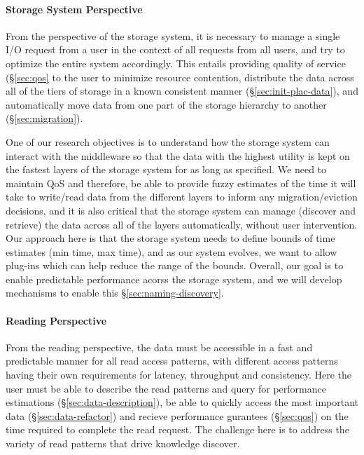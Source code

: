 \paragraph{Storage System Perspective}
\label{subsec:storage-perspective}
From the perspective of the storage system, it is necessary to manage a
single I/O request from a user in the context of all requests from all
users, and try to optimize the entire system accordingly. This entails
providing quality of service (\S\ref{sec:qos} to the user to minimize
resource contention, distribute the data across all of the tiers of storage
in a known consistent manner (\S\ref{sec:init-plac-data}), and automatically move data from one part of
the storage hierarchy to another (\S\ref{sec:migration}). 

One of our research objectives is to understand how the
storage system can interact with the middleware   so
that the data with the highest utility is kept on the fastest layers of the
storage system for as long as specified. We need to maintain 
QoS and therefore, be able to provide fuzzy estimates of the time it will take to write/read data from
the different layers to inform any migration/eviction decisions, and it
is also critical that the storage system can manage (discover and retrieve) the data across all of the
layers automatically, without user intervention. 
Our approach here is that the storage system needs to define bounds of time estimates
(min time, max time), and as our system evolves, we want to allow plug-ins which can help
reduce the range of the bounds.
Overall, our goal is to enable predictable performance acorss the storage system, and we will develop mechanisms to enable this
\S\ref{sec:naming-discovery}.



\paragraph{Reading  Perspective}
\label{subsec:reading-perspective}

From the reading perspective, the data must be accessible in a fast and
predictable manner for all read access patterns, with different access
patterns having their own requirements for latency, throughput and
consistency. Here the user must be able to describe the read patterns and
query for performance estimations (\S\ref{sec:data-description}), be able
to quickly access the most important data (\S\ref{sec:data-refactor}) and recieve
performance gurantees (\S\ref{sec:qos}) on the time required to complete
the read request. The challenge here is to address the variety of read
patterns that drive knowledge discover. 

